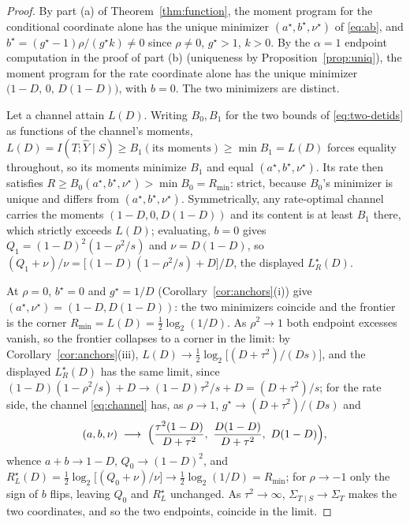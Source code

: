 \documentclass[11pt,onecolumn]{IEEEtran}
\newcommand{\hY}{\widehat{Y}}
\newcommand{\LRs}{L_{R}^{\star}}
\newcommand{\RLs}{R_{L}^{\star}}
\begin{document}
\begin{proof}
By part (a) of Theorem~\ref{thm:function}, the moment program for the conditional
coordinate alone has the unique minimizer
$(a^\star,b^\star,\nu^\star)$ of \eqref{eq:ab}, and
$b^\star=(g^\star-1)\rho/(g^\star k)\ne0$ since $\rho\ne0$,
$g^\star>1$, $k>0$. By the $\alpha=1$ endpoint computation in
the proof of part (b) (uniqueness by
Proposition~\ref{prop:uniq}), the moment program for the rate
coordinate alone has the unique minimizer
$\bigl(1-D,\,0,\,D(1-D)\bigr)$, with $b=0$. The two minimizers are
distinct.

Let a channel attain $L(D)$. Writing $B_0,B_1$ for the two bounds of
\eqref{eq:two-detids} as functions of the channel's moments,
$L(D)=I(T;\hY\mid S)\ge B_1(\text{its moments})\ge\min B_1=L(D)$
forces equality throughout, so its moments minimize $B_1$ and equal
$(a^\star,b^\star,\nu^\star)$. Its rate then satisfies
$R\ge B_0(a^\star,b^\star,\nu^\star)>\min B_0=R_{\min}$: strict, because
$B_0$'s minimizer is unique and differs from
$(a^\star,b^\star,\nu^\star)$. Symmetrically, any rate-optimal channel
carries the moments $(1-D,0,D(1-D))$ and its content is at least $B_1$
there, which strictly exceeds $L(D)$; evaluating, $b=0$ gives
$Q_1=(1-D)^2(1-\rho^2/s)$ and $\nu=D(1-D)$, so
$(Q_1+\nu)/\nu=\bigl[(1-D)(1-\rho^2/s)+D\bigr]/D$, the displayed $\LRs(D)$.

At $\rho=0$, $b^\star=0$ and $g^\star=1/D$
(Corollary~\ref{cor:anchors}(i)) give
$(a^\star,\nu^\star)=(1-D,D(1-D))$: the two minimizers coincide and the
frontier is the corner $R_{\min}=L(D)=\tfrac12\log_2(1/D)$. As
$\rho^2\to1$ both endpoint excesses vanish, so the frontier collapses
to a corner in the limit: by Corollary~\ref{cor:anchors}(iii),
$L(D)\to\tfrac12\log_2\bigl[(D+\tau^2)/(Ds)\bigr]$, and the displayed
$\LRs(D)$ has the same limit, since
$(1-D)(1-\rho^2/s)+D\to(1-D)\tau^2/s+D=(D+\tau^2)/s$; for the rate
side, the channel \eqref{eq:channel} has, as $\rho\to1$,
$g^\star\to(D+\tau^2)/(Ds)$ and
\[
(a,b,\nu)\;\longrightarrow\;
\Bigl(\frac{\tau^2(1-D)}{D+\tau^2},\
\frac{D(1-D)}{D+\tau^2},\ D(1-D)\Bigr),
\]
whence $a+b\to1-D$, $Q_0\to(1-D)^2$, and
$\RLs(D)=\tfrac12\log_2\bigl[(Q_0+\nu)/\nu\bigr]
\to\tfrac12\log_2(1/D)=R_{\min}$; for $\rho\to-1$ only the sign of $b$
flips, leaving $Q_0$ and $\RLs$ unchanged. As $\tau^2\to\infty$,
$\Sigma_{T\mid S}\to\Sigma_T$ makes the two coordinates, and so the
two endpoints, coincide in the limit.
\end{proof}
\end{document}
